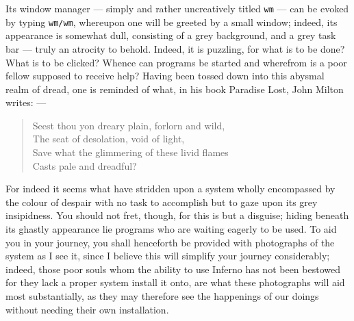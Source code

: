 \documentclass[a4paper,12pt]{report}
\begin{document}
    Its window manager — simply and rather uncreatively titled \texttt{wm} — can be evoked by typing \texttt{wm/wm}, whereupon one will be greeted by a small window; indeed, its appearance is somewhat dull, consisting of a grey background, and a grey task bar — truly an atrocity to behold. Indeed, it is puzzling, for what is to be done? What is to be clicked? Whence can programs be started and wherefrom is a poor fellow supposed to receive help? Having been tossed down into this abysmal realm of dread, one is reminded of what, in his book Paradise Lost, John Milton writes: —

    \begin{quote}
      Seest thou yon dreary plain, forlorn and wild, \\
      The seat of desolation, void of light, \\
      Save what the glimmering of these livid flames \\
      Casts pale and dreadful?
    \end{quote}

    For indeed it seems what have stridden upon a system wholly encompassed by the colour of despair with no task to accomplish but to gaze upon its grey insipidness. You should not fret, though, for this is but a disguise; hiding beneath its ghastly appearance lie programs who are waiting eagerly to be used. To aid you in your journey, you shall henceforth be provided with photographs of the system as I see it, since I believe this will simplify your journey considerably; indeed, those poor souls whom the ability to use Inferno has not been bestowed for they lack a proper system install it onto, are what these photographs will aid most substantially, as they may therefore see the happenings of our doings without needing their own installation.
\end{document}
